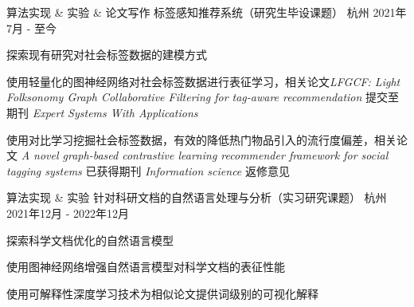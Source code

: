 

\begin{cventries}

  \cventry
    {算法实现 \& 实验 \& 论文写作} %
    {标签感知推荐系统（研究生毕设课题）} %
    {杭州} %
    {2021年7月 - 至今} %
    {
      \begin{cvitems} %
        \item {探索现有研究对社会标签数据的建模方式}
        \item {使用轻量化的图神经网络对社会标签数据进行表征学习，相关论文\emph{LFGCF: Light Folksonomy Graph Collaborative Filtering for tag-aware recommendation} 提交至期刊 \emph{Expert Systems With Applications}}
        \item {使用对比学习挖掘社会标签数据，有效的降低热门物品引入的流行度偏差，相关论文 \emph{A novel graph-based contrastive learning recommender framework for social tagging systems} 已获得期刊 \emph{Information science} 返修意见}
      \end{cvitems}
    }

  \cventry
    {算法实现 \& 实验} %
    {针对科研文档的自然语言处理与分析（实习研究课题）} %
    {杭州} %
    {2021年12月 - 2022年12月} %
    {
      \begin{cvitems}
        \item {探索科学文档优化的自然语言模型}
        \item {使用图神经网络增强自然语言模型对科学文档的表征性能}
        \item {使用可解释性深度学习技术为相似论文提供词级别的可视化解释}
      \end{cvitems}
    }

\end{cventries}


